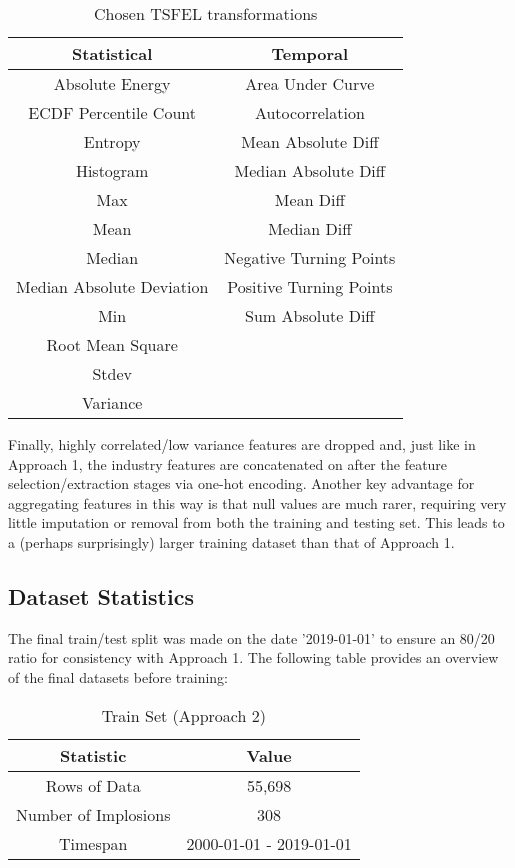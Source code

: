 \documentclass[a4paper]{report}
\begin{document}
\begin{table}[htbp]
  \centering
  \begin{tabular}{|c|c|}
  \hline
  \textbf{Statistical} & \textbf{Temporal} \\
  \hline
  Absolute Energy & Area Under Curve \\
  ECDF Percentile Count & Autocorrelation \\
  Entropy & Mean Absolute Diff \\
  Histogram & Median Absolute Diff \\
  Max & Mean Diff \\
  Mean & Median Diff \\
  Median & Negative Turning Points \\
  Median Absolute Deviation & Positive Turning Points \\
  Min & Sum Absolute Diff \\
  Root Mean Square &  \\
  Stdev &  \\
  Variance & \\

  \hline
  \end{tabular}
  \caption{Chosen TSFEL transformations}
  \label{tab:tsfel}
\end{table}Finally, highly correlated/low variance features are dropped and, just like in Approach 1, the industry features are concatenated on after the feature selection/extraction stages via one-hot encoding. Another 
key advantage for aggregating features in this way is that null values are much rarer, requiring very little imputation or removal from both the training and testing set. This leads to a (perhaps surprisingly) larger 
training dataset than that of Approach 1.

\subsection{Dataset Statistics}
The final train/test split was made on the date '2019-01-01' to ensure an 80/20 ratio for consistency with Approach 1. The following table provides an overview of the final datasets before training:
\begin{table}[htbp]
  \centering
  \begin{tabular}{|c|c|}
  \hline
  \textbf{Statistic} & \textbf{Value} \\
  \hline
  Rows of Data & 55,698 \\
  Number of Implosions & 308 \\
  Timespan & 2000-01-01 - 2019-01-01\\
  \hline
  \end{tabular}
  \caption{Train Set (Approach 2)}
  \label{tab:train_set_app2}
\end{table}
\end{document}
